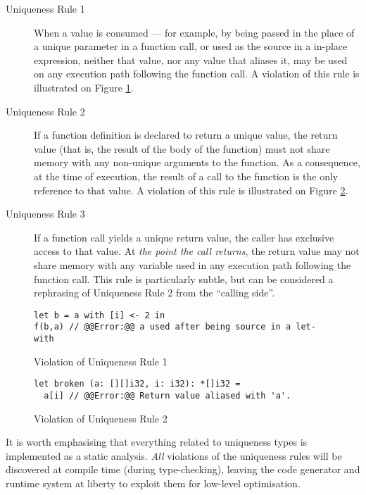 \documentclass[oneside,11pt]{book}
\begin{document}
\begin{description}
\item[Uniqueness Rule 1] When a value is consumed --- for example, by
  being passed in the place of a unique parameter in a function call,
  or used as the source in a in-place  expression, neither
  that value, nor any value that aliases it, may be used on any
  execution path following the function call.  A violation of this
  rule is illustrated on Figure \ref{fig:uniqueness-rule-1-violation}.

\item[Uniqueness Rule 2] If a function definition is declared to
  return a unique value, the return value (that is, the result of the
  body of the function) must not share memory with any non-unique
  arguments to the function.  As a consequence, at the time of
  execution, the result of a call to the function is the only
  reference to that value.  A violation of this rule is illustrated on
  Figure \ref{fig:uniqueness-rule-2-violation}.

\item[Uniqueness Rule 3] If a function call yields a unique return
  value, the caller has exclusive access to that value.  At
  \textit{the point the call returns}, the return value may not share
  memory with any variable used in any execution path following the
  function call.  This rule is particularly subtle, but can be
  considered a rephrasing of Uniqueness Rule 2 from the ``calling
  side''.
\end{description}

\begin{figure}
\centering
\begin{lstlisting}
let b = a with [i] <- 2 in
f(b,a) // @@Error:@@ a used after being source in a let-with
\end{lstlisting}
\caption{Violation of Uniqueness Rule 1}
\label{fig:uniqueness-rule-1-violation}
\end{figure}

\begin{figure}
\centering
\begin{lstlisting}
let broken (a: [][]i32, i: i32): *[]i32 =
  a[i] // @@Error:@@ Return value aliased with 'a'.
\end{lstlisting}
\caption{Violation of Uniqueness Rule 2}
\label{fig:uniqueness-rule-2-violation}
\end{figure}

It is worth emphasising that everything related to uniqueness types is
implemented as a static analysis.  \textit{All} violations of the
uniqueness rules will be discovered at compile time (during
type-checking), leaving the code generator and runtime system at
liberty to exploit them for low-level optimisation.
\end{document}
